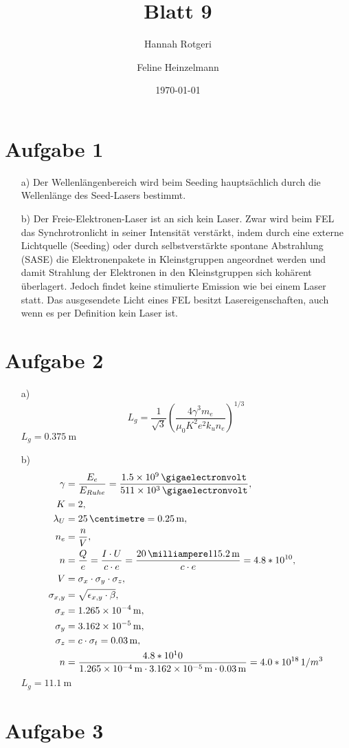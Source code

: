 \documentclass[11pt,a4paper]{article}
\title{Blatt 9}
\date{\today}
\author{Hannah Rotgeri \and Feline Heinzelmann}
\begin{document}
    \maketitle

    \section*{Aufgabe 1}
	\begin{itemize}
		\item[a)] 
			Der Wellenlängenbereich wird beim Seeding hauptsächlich durch die Wellenlänge des Seed-Lasers bestimmt. 
		\item[b)]
			Der Freie-Elektronen-Laser ist an sich kein Laser. Zwar wird beim FEL das Synchrotronlicht in seiner Intensität verstärkt, indem durch eine 
			externe Lichtquelle (Seeding) oder durch selbstverstärkte spontane Abstrahlung (SASE) die Elektronenpakete in Kleinstgruppen angeordnet werden
			und damit Strahlung der Elektronen in den Kleinstgruppen sich kohärent überlagert. Jedoch findet keine stimulierte Emission wie bei einem Laser statt.
			Das ausgesendete Licht eines FEL besitzt Lasereigenschaften, auch wenn es per Definition kein Laser ist.
	\end{itemize}


	
    \section*{Aufgabe 2}
	\begin{itemize}
		\item[a)] 
			\begin{equation*}
				L_{g} = \frac{1}{\sqrt{3}} (\frac{4 \gamma^3 m_{e}}{\mu_0 K^2 e^2 k_{u} n_{e}})^{1/3}
			\end{equation*}
			$L_{g} = \SI{0.375}{\meter}$
		\item[b)]
			\begin{align*}
				\gamma &= \frac{ E_{e} }{ E_{Ruhe} } = \frac{ \SI{1.5e9}{\gigaelectronvolt} }{ \SI{511e3}{\gigaelectronvolt} }, \\
				K &= 2, \\
				\lambda_{U} &= \SI{25}{\centimetre} = \SI{0.25}{\metre}, \\
				n_{e} &= \frac{n}{V}, \\
				n &= \frac{Q}{e} = \frac{I \cdot U}{c \cdot e} = \frac{\SI{20}{\milliampere} \SI{115.2}{\metre}}{c \cdot e} = 4.8*10^{10}, \\
				V &= \sigma_{x} \cdot \sigma_{y} \cdot \sigma_{z}, \\
				\sigma_{x,y} &= \sqrt{\epsilon_{x,y} \cdot \beta}, \\
				\sigma_{x} &= \SI{1.265e-4}{\metre}, \\
				\sigma_{y} &= \SI{3.162e-5}{\metre}, \\
				\sigma_{z} &= c \cdot \sigma_{t} = \SI{0.03}{\metre}, \\
				n &= \frac{4.8*10^10}{  \SI{1.265e-4}{\metre} \cdot \SI{3.162e-5}{\meter} \cdot \SI{0.03}{\metre} } = 4.0*10^{18} \, 1/m^{3}
			\end{align*}
			$L_{g} = \SI{11.1}{\metre}$
	\end{itemize}

	\section*{Aufgabe 3}
\end{document}
